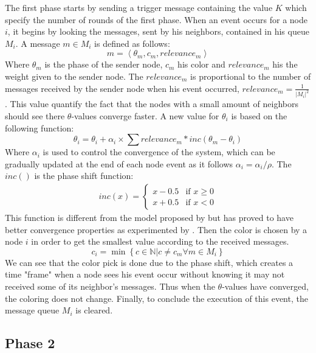 \documentclass[letterpaper]{article}
\begin{document}
The first phase starts by sending a trigger message containing the value $K$ which specify the number of rounds of the first phase. When an event occurs for a node $i$, it begins by looking the messages, sent by his neighbors, contained in his queue $M_i$. A message $m \in M_i$ is defined as follows: \[ m = \left\langle \theta_m, c_m, relevance_m \right\rangle \]
Where $\theta_m$ is the phase of the sender node, $c_m$ his color and $relevance_m$ his the weight given to the sender node. The $relevance_m$ is proportional to the number of messages received by the sender node when his event occurred, $relevance_m = \frac{1}{|M_i|^2}$. This value quantify the fact that the nodes with a small amount of neighbors should see there $\theta$-values converge faster. A new value for $\theta_i$ is based on the following function:
\begin{equation} 
\theta_i = \theta_i + \alpha_i \times \sum relevance_m * inc(\theta_m-\theta_i) 
\end{equation}
Where $\alpha_i$ is used to control the convergence of the system, which can be gradually updated at the end of each node event as it follows $\alpha_i = \alpha_i/\rho$. The $inc()$ is the phase shift function:
\begin{align} 
inc(x) = 
\begin{cases}
	x-0.5 & \text{if } x \geq 0 \\
	x+0.5 & \text{if } x < 0
\end{cases}
\end{align}
This function is different from the model proposed by \cite{Aihara} but has proved to have better convergence properties as experimented by \cite{HH12}.
Then the color is chosen by a node $i$ in order to get the smallest value according to the received messages.
\begin{equation*}
c_i = \min \left\lbrace c \in \mathbb{N} | c \neq c_m \forall m \in M_i \right\rbrace   
\end{equation*}
We can see that the color pick is done due to the phase shift, which creates a time "frame" when a node sees his event occur without knowing it may not received some of its neighbor's messages. Thus when the $\theta$-values have converged, the coloring does not change.
Finally, to conclude the execution of this event, the message queue $M_i$ is cleared.
\subsection{Phase 2}

\end{document}
